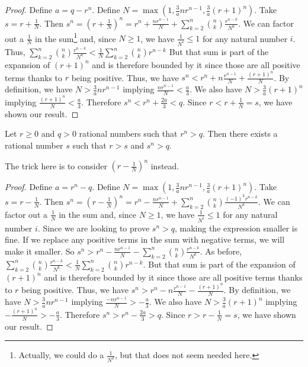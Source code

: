 \documentclass[12pt]{article}
\begin{document}
\begin{proof}
Define $a = q - r^n$. Define $N =  \max(1,\tfrac{3}{a}n r^{n-1}, \tfrac{3}{a}(r+1)^n)$.  Take $s = r + \tfrac{1}{N}$. Then $s^n = (r+ \tfrac{1}{N})^n = r^n + \tfrac{n r^{n-1}}{N} + \sum_{k=2}^{n} \binom{n}{k} \tfrac{r^{n-k}}{N^k}$. We can factor out a $\tfrac{1}{N}$ in the sum\footnote{Actually, we could do a $\frac{1}{N^2}$, but that does not seem needed here.} and, since $N \geq 1$, we have $\tfrac{1}{N^i} \leq  1$ for any natural number $i$. Thus, $\sum_{k=2}^{n} \binom{n}{k} \tfrac{r^{n-k}}{N^k} < \tfrac{1}{N} \sum_{k=2}^{n} \binom{n}{k} r^{n-k}$  But that sum is part of the expansion of $(r+1)^n$ and is therefore bounded by it since those are all positive terms thanks to $r$ being positive. Thus, we have $s^n < r^n + n \tfrac{r^{n-1}}{N} + \tfrac{ (r+1)^n }{N}$.  By definition, we have $N > \tfrac{3}{a} n r^{n-1}$ implying $\tfrac{ n r^{n-1}}{N} < \tfrac{a}{3}$. We also have $N > \tfrac{3}{a} (r+1)^n$ implying $ \tfrac{(r+1)^n}{N} < \tfrac{a}{3}$. Therefore $s^n < r^n + \tfrac{2 a}{3} < q$. Since $r< r + \frac{1}{N} = s$, we have shown our result. 
\end{proof}

\begin{lemma}\label{app:greater}
Let $r \geq 0 $ and $q > 0$ rational numbers such that $r^n > q$. Then there exists a rational number $s$ such that $r > s$ and $s^n > q$.
\end{lemma}

The trick here is to consider $(r-\tfrac{1}{N})^n$ instead. 

\begin{proof}
Define $a = r^n - q$. Define $N =  \max(1,\tfrac{3}{a}n r^{n-1}, \tfrac{3}{a}(r+1)^n)$.  Take $s = r - \tfrac{1}{N}$. Then $s^n = (r- \tfrac{1}{N})^n = r^n - \tfrac{n r^{n-1}}{N} + \sum_{k=2}^{n} \binom{n}{k} \tfrac{ (-1)^{k} r^{n-k}}{N^{k}}$. We can factor out a $\tfrac{1}{N}$ in the sum and, since $N \geq 1$, we have $\tfrac{1}{N^i} \leq 1$ for any natural number $i$. Since we are looking to prove $s^n > q$, making the expression smaller is fine. If we replace any positive terms in the sum with negative terms, we will make it smaller. So $s^n > r^n - \tfrac{n r^{n-1}}{N} - \sum_{k=2}^{n} \binom{n}{k} \tfrac{r^{n-k}}{N^{k}}$. As before, $\sum_{k=2}^{n} \binom{n}{k} \tfrac{r^{n-k}}{N^{k}} < \tfrac{1}{N} \sum_{k=2}^{n} \binom{n}{k} r^{n-k}$.  But that sum is part of the expansion of $(r+1)^n$ and is therefore bounded by it since those are all positive terms thanks to $r$ being positive. Thus, we have $s^n > r^n - n \tfrac{r^{n-1}}{N} - \tfrac{ (r+1)^n }{N}$.  By definition, we have $N > \tfrac{3}{a} n r^{n-1}$ implying $ \tfrac{-n r^{n-1}}{N} > -\tfrac{a}{3}$. We also have $N > \tfrac{3}{a} (r+1)^n$ implying $ -\tfrac{(r+1)^n}{N} > -\tfrac{a}{3}$. Therefore $s^n > r^n - \tfrac{2 a}{3} > q$. Since $r> r - \frac{1}{N} = s$, we have shown our result. 
\end{proof}
\end{document}

